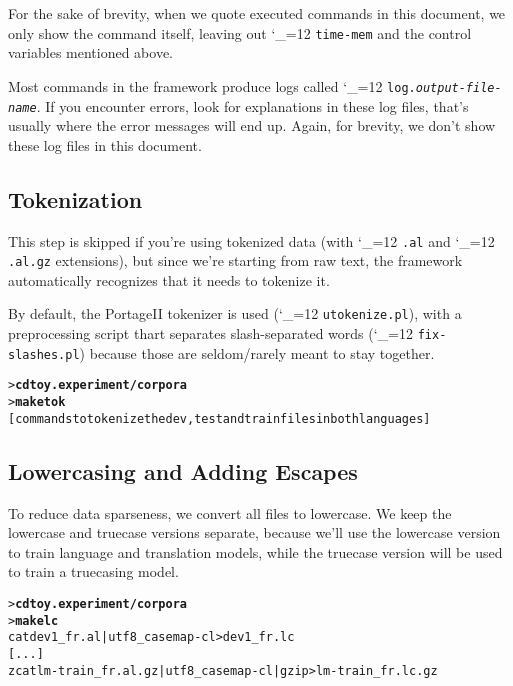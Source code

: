\documentclass[11pt,letterpaper]{article}
\newcommand{\PS}{PortageII\xspace}
\def\code{\begingroup\catcode`\_=12 \codex}
\newcommand{\codex}[1]{\texttt{#1}\endgroup}
\begin{document}
For the sake of brevity, when we quote executed commands in this document, we
only show the command itself, leaving out \code{time-mem} and the control
variables mentioned above.

Most commands in the framework produce logs called
\code{log.\emph{output-file-name}}.  If you encounter errors, look for
explanations in these log files, that's usually where the error messages will
end up.  Again, for brevity, we don't show these log files in this document.

\subsection{Tokenization} \label{Tokenizing}

This step is skipped if you're using tokenized data (with \code{.al} and
\code{.al.gz} extensions), but since we're starting from raw text, the
framework automatically recognizes that it needs to tokenize it.

By default, the \PS tokenizer is used (\code{utokenize.pl}), with a
preprocessing script thart separates slash-separated words
(\code{fix-slashes.pl}) because those are seldom/rarely meant to stay together.

\begin{small}
\begin{alltt}
   > \textbf{cd toy.experiment/corpora}
   > \textbf{make tok}
   [commands to tokenize the dev, test and train files in both languages]
\end{alltt}
\end{small}

\subsection{Lowercasing and Adding Escapes} \label{Lowercasing}

To reduce data sparseness, we convert all files to lowercase.
We keep the lowercase and truecase
versions separate, because we'll use the lowercase version to train language
and translation models, while the truecase version will be used to train a
truecasing model.
\begin{small}
\begin{alltt}
   > \textbf{cd toy.experiment/corpora}
   > \textbf{make lc}
   cat dev1_fr.al | utf8_casemap -c l > dev1_fr.lc
   [...]
   zcat lm-train_fr.al.gz | utf8_casemap -c l | gzip > lm-train_fr.lc.gz
\end{alltt}
\end{small}
\end{document}
